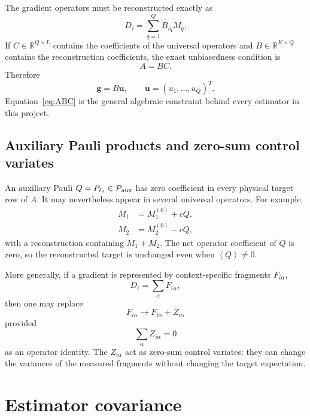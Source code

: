 \documentclass[11pt]{article}
\newcommand{\expect}[1]{\left\langle#1\right\rangle}
\newcommand{\R}{\mathbb{R}}
\newcommand{\Pset}{\mathcal P}
\begin{document}
The gradient operators must be reconstructed exactly as
\begin{equation}
  D_i=\sum_{q=1}^{Q}B_{iq}M_q.
  \label{eq:reconstruction}
\end{equation}
If $C\in\R^{Q\times L}$ contains the coefficients of the universal operators and $B\in\R^{K\times Q}$ contains the reconstruction coefficients, the exact unbiasedness condition is
\begin{equation}
  \boxed{A=BC.}
  \label{eq:ABC}
\end{equation}
Therefore
\begin{equation}
  \bm g=B\bm u,
  \qquad
  \bm u=(u_1,\ldots,u_Q)^T.
\end{equation}
Equation~\eqref{eq:ABC} is the general algebraic constraint behind every estimator in this project.

\subsection{Auxiliary Pauli products and zero-sum control variates}

An auxiliary Pauli $Q=P_{\ell_0}\in\Pset_{\rm aux}$ has zero coefficient in every physical target row of $A$.  It may nevertheless appear in several universal operators.  For example,
\begin{align}
  M_1 &= M_1^{(0)}+cQ,\\
  M_2 &= M_2^{(0)}-cQ,
\end{align}
with a reconstruction containing $M_1+M_2$.  The net operator coefficient of $Q$ is zero, so the reconstructed target is unchanged even when $\expect{Q}\neq0$.

More generally, if a gradient is represented by context-specific fragments $F_{i\alpha}$,
\begin{equation}
  D_i=\sum_\alpha F_{i\alpha},
\end{equation}
then one may replace
\begin{equation}
  F_{i\alpha}\longrightarrow F_{i\alpha}+Z_{i\alpha}
\end{equation}
provided
\begin{equation}
  \sum_\alpha Z_{i\alpha}=0
  \label{eq:zero-sum}
\end{equation}
as an operator identity.  The $Z_{i\alpha}$ act as zero-sum control variates: they can change the variances of the measured fragments without changing the target expectation.

\section{Estimator covariance}
\end{document}
